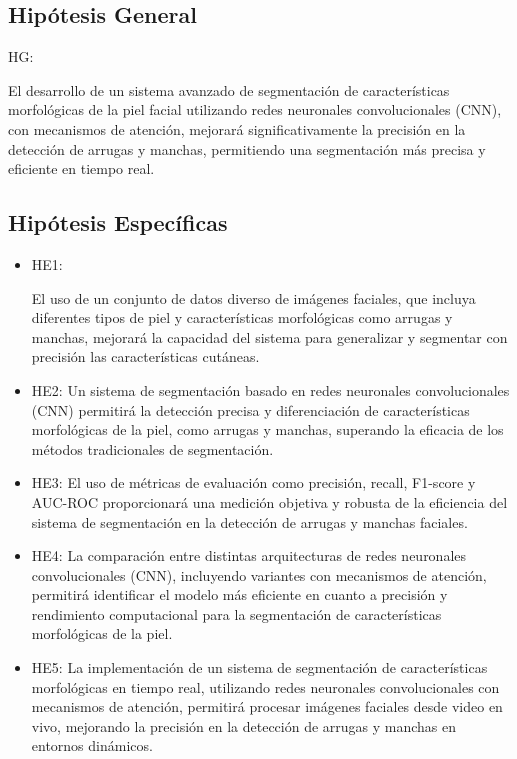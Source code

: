 \subsection{Hipótesis General}
HG: \newcommand{\HipotesisGeneral}{
	El desarrollo de un sistema avanzado de segmentación de características morfológicas de la piel facial utilizando redes neuronales convolucionales (CNN), con mecanismos de atención, mejorará significativamente la precisión en la detección de arrugas y manchas, permitiendo una segmentación más precisa y eficiente en tiempo real.}
\HipotesisGeneral


\subsection{Hipótesis Específicas}
\newcommand{\Hone}{

El uso de un conjunto de datos diverso de imágenes faciales, que incluya diferentes tipos de piel y características morfológicas como arrugas y manchas, mejorará la capacidad del sistema para generalizar y segmentar con precisión las características cutáneas.
}
\newcommand{\Htwo}{
	Un sistema de segmentación basado en redes neuronales convolucionales (CNN) permitirá la detección precisa y diferenciación de características morfológicas de la piel, como arrugas y manchas, superando la eficacia de los métodos tradicionales de segmentación.}
\newcommand{\Hthree}{
	El uso de métricas de evaluación como precisión, recall, F1-score y AUC-ROC proporcionará una medición objetiva y robusta de la eficiencia del sistema de segmentación en la detección de arrugas y manchas faciales.
	}
\newcommand{\Hfour}{
	La comparación entre distintas arquitecturas de redes neuronales convolucionales (CNN), incluyendo variantes con mecanismos de atención, permitirá identificar el modelo más eficiente en cuanto a precisión y rendimiento computacional para la segmentación de características morfológicas de la piel.
	}
\newcommand{\Hfive}{
	La implementación de un sistema de segmentación de características morfológicas en tiempo real, utilizando redes neuronales convolucionales con mecanismos de atención, permitirá procesar imágenes faciales desde video en vivo, mejorando la precisión en la detección de arrugas y manchas en entornos dinámicos.
	}

\begin{itemize}
	\item HE1: {\Hone}
	\item HE2: {\Htwo}
	\item HE3: {\Hthree}
	\item HE4: {\Hfour}
	\item HE5: {\Hfive}
\end{itemize}